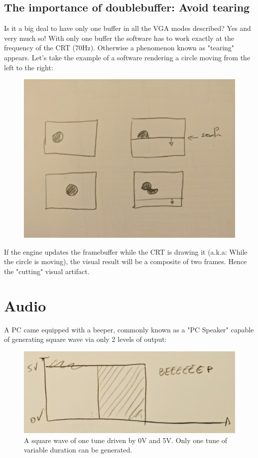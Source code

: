 \documentclass[book.tex]{subfiles}
\begin{document}
\subsection{The importance of doublebuffer: Avoid tearing}
Is it a big deal to have only one buffer in all the VGA modes described? Yes and very much so! With only one buffer the software has to work exactly at the frequency of the CRT (70Hz). Otherwise a phenomenon known as "tearing" appears. Let's take the example of a software rendering a circle moving from the left to the right:
\par
 \begin{figure}[H]
\centering
 \includegraphics[width=\textwidth]{imgs/double_buffer_explained.png}
 \end{figure}
\par
If the engine updates the framebuffer while the CRT is drawing it (a.k.a: While the circle is moving), the visual result will be a composite of two frames. Hence the "cutting" visual artifact.




\section{Audio}
A PC came equipped with a beeper, commonly known as a "PC Speaker" capable of generating square wave via only 2 levels of output:\\
\par
 \begin{figure}[H]
\centering
\includegraphics[width=\textwidth]{imgs/square_wave.png}
\caption{A square wave of one tune driven by 0V and 5V. Only one tune of variable duration can be generated.}
\end{figure}
\end{document}
